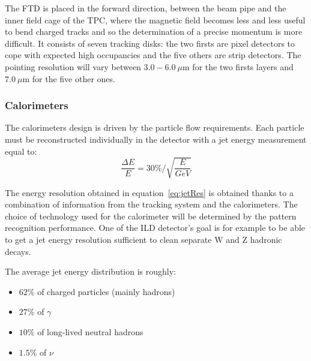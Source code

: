     The FTD is placed in the forward direction, between the beam pipe and the inner field cage of the TPC, where the magnetic field becomes less and less useful to bend charged tracks and so the determination of a precise momentum is more difficult.
     It consists of seven tracking disks: the two firsts are pixel detectors to cope with expected high occupancies and the five others are strip detectors.
     The pointing resolution will vary between $3.0-6.0 \ \mu$m for the two firsts layers and $7.0 \ \mu$m for the five other ones.
     


      \subsubsection{Calorimeters}

      The calorimeters design is driven by the particle flow requirements.
      Each particle must be reconstructed individually in the detector with a jet energy measurement equal to:
      \begin{equation}
        \frac{\Delta E}{E} = 30 \% / \sqrt{\frac{E}{GeV}}
        \label{eq:jetRes}
      \end{equation}

      The energy resolution obtained in equation~\ref{eq:jetRes} is obtained thanks to a combination of information from the tracking system and the calorimeters. 
      The choice of technology used for the calorimeter will be determined by the pattern recognition performance. 
      One of the \gls{ILD} detector's goal is for example to be able to get a jet energy resolution sufficient to clean separate W and Z hadronic decays.
      
      The average jet energy distribution is roughly: 
      \begin{itemize}
        \item $62 \%$ of charged particles (mainly hadrons)
        \item $27 \%$ of $\gamma$
        \item $10 \%$ of long-lived neutral hadrons
        \item $1.5 \%$ of $\nu$
      \end{itemize}

